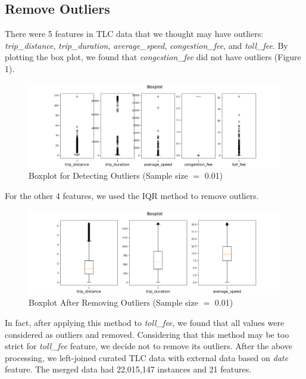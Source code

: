 \documentclass[11pt]{article}
\begin{document}
\subsection{Remove Outliers}

There were 5 features in TLC data that we thought may have outliers: \textit{trip\_distance}, \textit{trip\_duration}, \textit{average\_speed}, \textit{congestion\_fee}, and \textit{toll\_fee}. By plotting the box plot, we found that \textit{congestion\_fee} did not have outliers (Figure 1).

\begin{figure}[h]
  \centering
  \includegraphics[width=1\textwidth]{boxplot_for_detecting_outlier_1.png}
  \caption{Boxplot for Detecting Outliers (Sample size $=$ 0.01)}
  \label{fig:my_label}
\end{figure}

For the other 4 features, we used the IQR method to remove outliers.

\begin{figure}[h]
  \centering
  \includegraphics[width=1\textwidth]{boxplot_for_detecting_outlier_2.png}
  \caption{Boxplot After Removing Outliers (Sample size $=$ 0.01)}
  \label{fig:my_label}
\end{figure}

In fact, after applying this method to \textit{toll\_fee}, we found that all values were considered as outliers and removed. Considering that this method may be too strict for \textit{toll\_fee} feature, we decide not to remove its outliers. After the above processing, we left-joined curated TLC data with external data based on \textit{date} feature. The merged data had 22,015,147 instances and 21 features.
\end{document}
